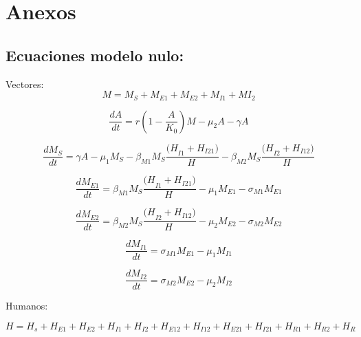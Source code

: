 \documentclass[journal]{IEEEtran}
\begin{document}



\onecolumn

\section{Anexos}

\subsection{Ecuaciones modelo nulo:}

Vectores:
\begin{equation}
    \label{eq1}
    M=M_S+M_{E1}+M_{E2}+M_{I1}+MI_2
\end{equation}

\begin{equation}
    \label{eq1}
    \frac{dA}{dt}=r\left(1-\frac{A}{K_0}\right)M-\mu_2A-\gamma A
\end{equation}

\begin{equation}
    \label{eq1}
    \frac{dM_S}{dt}=\gamma A-\mu_1M_S-\beta_{M1}M_S\frac{{(H}_{I1}+H_{I21})}{H\ }-\beta_{M2}M_S\frac{{(H}_{I2}+H_{I12})}{H\ }
\end{equation}

\begin{equation}
    \label{eq1}
    \frac{dM_{E1}}{dt}=\beta_{M1}M_S\frac{{(H}_{I1}+H_{I21})}{H\ }-\mu_1M_{E1}-\sigma_{M1}M_{E1}
\end{equation}

\begin{equation}
    \label{eq1}
    \frac{dM_{E2}}{dt}=\beta_{M2}M_S\frac{{(H}_{I2}+H_{I12})}{H\ }-\mu_2M_{E2}-\sigma_{M2}M_{E2}
\end{equation}

\begin{equation}
    \label{eq1}
    \frac{dM_{I1}}{dt}=\sigma_{M1}M_{E1}-\mu_1M_{I1}
\end{equation}

\begin{equation}
    \label{eq1}
    \frac{dM_{I2}}{dt}=\sigma_{M2}M_{E2}-\mu_2M_{I2}
\end{equation}

Humanos:

\begin{equation}
    \label{eq1}    H=H_s+H_{E1}+H_{E2}+H_{I1}+H_{I2}+H_{E12}+H_{I12}+H_{E21}+H_{I21}+H_{R1}+H_{R2}+H_R
\end{equation}
\end{document}
